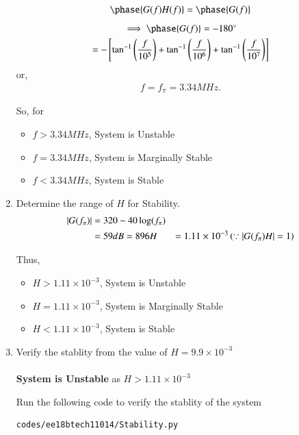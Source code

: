 \begin{enumerate}[label=\thesection.\arabic*.,ref=\thesection.\theenumi]
\begin{align}
\phase{G(f)H(f)} = \phase{G(f)}
\end{align}
\begin{multline}
\implies \phase{G(f)} = -180\degree
\\
=-\sbrak{\tan ^{-1}\brak{\frac{f}{10^{5}}}+\tan ^{-1}\brak{\frac{f}{10^{6}}}+\tan ^{-1}\brak{\frac{f}{10^{7}}}}
\end{multline}
or,
\begin{align}
f = f_{\pi} = 3.34 M Hz.
\end{align}

So, for 
\begin{itemize}
\item $f > 3.34 M Hz$, System is Unstable
\item $f = 3.34 M Hz$, System is Marginally Stable
\item $f < 3.34 M Hz$, System is Stable
\end{itemize}
\item Determine the range of $H$ for Stability.\\
\solution
\begin{align}
\left\vert G(f_{\pi})\right\vert &= 320 - 40\log(f_{\pi})\\
 &= 59 dB = 896
H &= 1.11 \times 10^{-3} \left(\because \left\vert G(f_{\pi})H\right\vert = 1\right)
\end{align}


Thus, 
\begin{itemize}
\item $H > 1.11 \times 10^{-3}$, System is Unstable
\item $H = 1.11 \times 10^{-3}$, System is Marginally Stable
\item $H < 1.11 \times 10^{-3}$, System is Stable
\end{itemize}

\item Verify the stablity from the value of $H=9.9\times 10^{-3}$\\
\solution\\
\textbf{System is Unstable} as $H>1.11\times 10^{-3}$

Run the following code to verify the stablity of the system
\begin{lstlisting}
codes/ee18btech11014/Stability.py
\end{lstlisting}


\end{enumerate}
